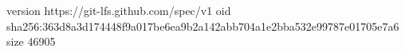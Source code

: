 version https://git-lfs.github.com/spec/v1
oid sha256:363d8a3d174448f9a017be6ea9b2a142abb704a1e2bba532e99787e01705e7a6
size 46905
